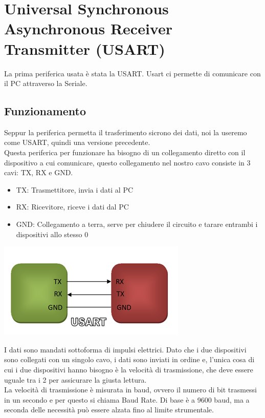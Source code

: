 
\section{Universal Synchronous Asynchronous Receiver Transmitter (USART)}
La prima periferica usata è stata la USART. Usart ci permette di comunicare con il PC attraverso la Seriale.
\\

\subsection{Funzionamento}
Seppur la periferica permetta il trasferimento sicrono dei dati, noi la useremo come USART, quindi una versione precedente.\\

Questa periferica per funzionare ha bisogno di un collegamento diretto con il dispositivo a cui comunicare, questo collegamento nel nostro cavo consiste in 3 cavi: TX, RX e GND.\\


\noindent
\begin{minipage}[c]{0.54\linewidth}
    \begin{itemize}
        \item TX: Trasmettitore, invia i dati al PC
        \item RX: Ricevitore, riceve i dati dal PC
        \item GND: Collegamento a terra, serve per chiudere il circuito e tarare entrambi i dispositivi allo stesso 0
    \end{itemize}
\end{minipage}
\hfill
\begin{minipage}[t]{0.4\linewidth}

    \centering
    \includegraphics[width=0.7\linewidth]{microcontrollore/assets/USART.png}
    \label{fig:USART}
\end{minipage}

I dati sono mandati sottoforma di impulsi elettrici. Dato che i due dispositivi sono collegati con un singolo cavo, i dati sono inviati in ordine e, l'unica cosa di cui i due dispositivi hanno bisogno è la velocità di trasmissione, che deve essere uguale tra i 2 per assicurare la giusta lettura.\\
La velocità di trasmissione è misurata in baud, ovvero il numero di bit trasmessi in un secondo e per questo si chiama Baud Rate. Di base è a 9600 baud, ma a seconda delle necessità può essere alzata fino al limite strumentale.\\

